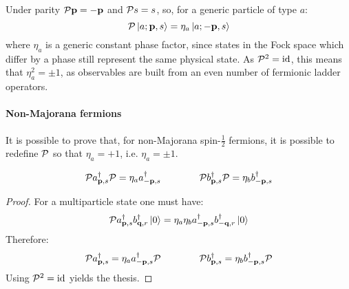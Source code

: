 Under parity $ \mathcal{P} \mathbf{p} = - \mathbf{p} $ and $ \mathcal{P} s = s $, so, for a generic particle of type $ a $:
\begin{equation}
  \mathcal{P} \ket{a; \mathbf{p},s} = \eta_a \ket{a; -\mathbf{p},s}
\end{equation}
where $ \eta_a $ is a generic constant phase factor, since states in the Fock space which differ by a phase still represent the same physical state. As $ \mathcal{P}^2 = \operatorname{id} $, this means that $ \eta_a^2 = \pm 1 $, as observables are built from an even number of fermionic ladder operators.

\paragraph{Non-Majorana fermions}

It is possible to prove that, for non-Majorana spin-$ \frac{1}{2} $ fermions, it is possible to redefine $ \mathcal{P} $ so that $ \eta_a = +1 $, i.e. $ \eta_a = \pm 1 $.

\begin{proposition}[before upper = {\tcbtitle}]{}{}
  \begin{equation}
    \mathcal{P} a_{\mathbf{p},s}^\dagger \mathcal{P} = \eta_a a_{-\mathbf{p},s}^\dagger
    \qquad \qquad
    \mathcal{P} b_{\mathbf{p},s}^\dagger \mathcal{P} = \eta_b b_{-\mathbf{p},s}^\dagger
    \label{eq:parity-op}
  \end{equation}
\end{proposition}

\begin{proofbox}
  \begin{proof}
    For a multiparticle state one must have:
    \begin{equation*}
      \mathcal{P} a_{\mathbf{p},s}^\dagger b_{\mathbf{q},r}^\dagger \ket{0} = \eta_a \eta_b a_{-\mathbf{p},s}^\dagger b_{-\mathbf{q},r}^\dagger \ket{0}
    \end{equation*}
    Therefore:
    \begin{equation*}
      \mathcal{P} a_{\mathbf{p},s}^\dagger = \eta_a a_{-\mathbf{p},s}^\dagger \mathcal{P}
      \qquad \qquad
      \mathcal{P} b_{\mathbf{p},s}^\dagger = \eta_b b_{-\mathbf{p},s}^\dagger \mathcal{P}
    \end{equation*}
    Using $ \mathcal{P}^2 = \operatorname{id} $ yields the thesis.
  \end{proof}
\end{proofbox}

